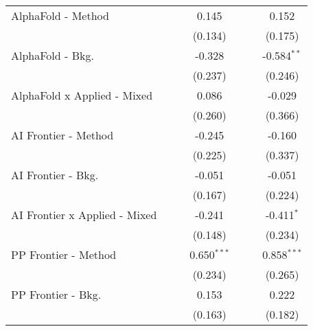\begin{tabular}{lcccccc}
   AlphaFold - Method             &             &             & 0.145         &              &               & 0.152\\   
                                  &             &             & (0.134)       &              &               & (0.175)\\   
   AlphaFold - Bkg.               &             &             & -0.328        &              &               & -0.584$^{**}$\\   
                                  &             &             & (0.237)       &              &               & (0.246)\\   
   AlphaFold x Applied - Mixed    &             &             & 0.086         &              &               & -0.029\\   
                                  &             &             & (0.260)       &              &               & (0.366)\\   
   AI Frontier - Method           &             &             & -0.245        &              &               & -0.160\\   
                                  &             &             & (0.225)       &              &               & (0.337)\\   
   AI Frontier - Bkg.             &             &             & -0.051        &              &               & -0.051\\   
                                  &             &             & (0.167)       &              &               & (0.224)\\   
   AI Frontier x Applied - Mixed  &             &             & -0.241        &              &               & -0.411$^{*}$\\   
                                  &             &             & (0.148)       &              &               & (0.234)\\   
   PP Frontier - Method           &             &             & 0.650$^{***}$ &              &               & 0.858$^{***}$\\   
                                  &             &             & (0.234)       &              &               & (0.265)\\   
   PP Frontier - Bkg.             &             &             & 0.153         &              &               & 0.222\\   
                                  &             &             & (0.163)       &              &               & (0.182)\\   

\end{tabular}
